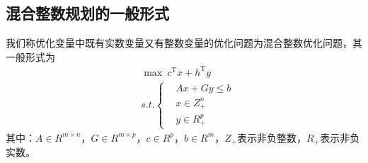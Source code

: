     \subsection{混合整数规划的一般形式}
        \par
        我们称优化变量中既有实数变量又有整数变量的优化问题为混合整数优化问题，其一般形式为
        \begin{align*}
        &\mathop{\max}\  c^\mathrm{T} x+h^\mathrm{T} y\\
        &s.t.\left\{
        \begin{aligned}
        &Ax+Gy \leqslant b\\
        &x \in Z_{+}^n\\
        &y \in R_{+}^p
        \end{aligned}
        \right.
        \end{align*}
        其中：$A \in R^{m\times n}$，$G \in R^{m\times p}$，$c \in R^p$，$b \in R^m$，$Z_{+}$表示非负整数，$R_+$表示非负实数。
